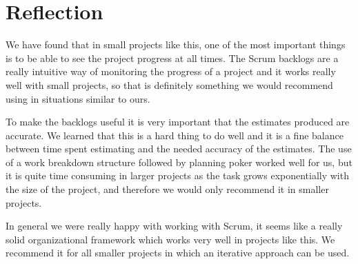 \section{Reflection}

We have found that in small projects like this, one of the most important
things is to be able to see the project progress at all times. The Scrum
backlogs are a really intuitive way of monitoring the progress of a project and
it works really well with small projects, so that is definitely something we
would recommend using in situations similar to ours.

To make the backlogs useful it is very important that the estimates produced
are accurate. We learned that this is a hard thing to do well and it is a fine
balance between time spent estimating and the needed accuracy of the estimates.
The use of a work breakdown structure followed by planning poker worked well for
us, but it is quite time consuming in larger projects as the task grows exponentially with the
size of the project, and therefore we would only recommend it in smaller
projects.

In general we were really happy with working with Scrum, it seems like a really
solid organizational framework which works very well in projects like this. We
recommend it for all smaller projects in which an iterative approach can be
used. 
